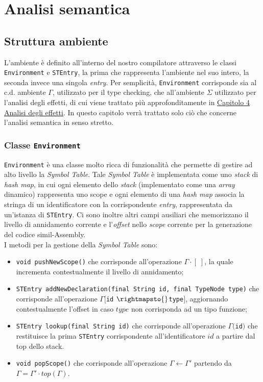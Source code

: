 \documentclass[../report.tex]{subfiles}
\begin{document}
\chapter{Analisi semantica}\label{c:analisi-semantica}
\section{Struttura ambiente}\label{s:struttura-ambiente}
L'ambiente è definito all'interno del nostro compilatore attraverso le classi \verb|Environment| e \verb|STEntry|, la prima che rappresenta l'ambiente nel suo intero, la seconda invece una singola \textit{entry}.
Per semplicità, \verb|Environment| corrisponde sia al c.d. ambiente $\Gamma{}$, utilizzato per il type checking, che all'ambiente $\Sigma{}$ utilizzato per l'analisi degli effetti, di cui viene trattato più approfonditamente in \hyperref[c:analisi-effetti]{Capitolo 4 Analisi degli effetti}. In questo capitolo verrà trattato solo ciò che concerne l'analisi semantica in senso stretto.

\subsection[Classe Environment]{Classe \texttt{Environment}}
\verb|Environment| è una classe molto ricca di funzionalità che permette di gestire ad alto livello la \textit{Symbol Table}. Tale \textit{Symbol Table} è implementata come uno \textit{stack} di \textit{hash map}, in cui ogni elemento dello \textit{stack} (implementato come una \textit{array} dinamico) rappresenta uno scope e ogni elemento di una \textit{hash map} associa la stringa di un identificatore con la corrispondente \textit{entry}, rappresentata da un'istanza di \verb|STEntry|.
Ci sono inoltre altri campi ausiliari che memorizzano il livello di annidamento corrente e l'\textit{offset} nello \textit{scope} corrente per la generazione del codice simil-Assembly.\\
I metodi per la gestione della \textit{Symbol Table} sono:
\begin{itemize}
    \item \verb|void pushNewScope()| che corrisponde all'operazione $\Gamma{}\cdot{}[\;]$, la quale incrementa contestualmente il livello di annidamento;
    \item \verb|STEntry addNewDeclaration(final String id, final TypeNode type)| che corrisponde all'operazione $\Gamma{}[$\verb|id| $ \rightmapsto{}$\verb|type|$]$, aggiornando contestualmente l'offset in caso $type$ non corrisponda ad un tipo funzione;
    \item \verb|STEntry lookup(final String id)| che corrisponde all'operazione $\Gamma($\verb|id|$)$ che restituisce la prima \verb|STEntry| corrispondente all'identificatore $id$ a partire dal top dello stack.
    \item \verb|void popScope()| che corrisponde all'operazione $\Gamma \leftarrow{} \Gamma'$ partendo da $\Gamma = \Gamma'\cdot{}top(\Gamma)$.
\end{itemize}
\end{document}
